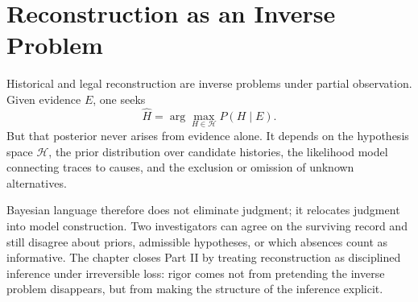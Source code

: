 
\chapter{Reconstruction as an Inverse Problem}
\label{ch:ch010}


Historical and legal reconstruction are inverse problems under partial observation. Given evidence \(E\), one seeks
\[
\widehat H
=
\arg\max_{H\in\mathcal H}
P(H\mid E).
\]
But that posterior never arises from evidence alone. It depends on the hypothesis space \(\mathcal H\), the prior distribution over candidate histories, the likelihood model connecting traces to causes, and the exclusion or omission of unknown alternatives.

Bayesian language therefore does not eliminate judgment; it relocates judgment into model construction. Two investigators can agree on the surviving record and still disagree about priors, admissible hypotheses, or which absences count as informative. The chapter closes Part II by treating reconstruction as disciplined inference under irreversible loss: rigor comes not from pretending the inverse problem disappears, but from making the structure of the inference explicit.
